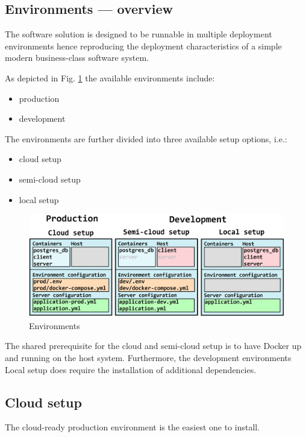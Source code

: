 \documentclass[a4paper,twoside,12pt]{book}
\begin{document}
\subsection{Environments — overview}

The software solution is designed to be runnable in multiple deployment environments hence reproducing the deployment characteristics of a simple modern business-class software system.

As depicted in Fig. \ref{fig:img:environments} the available environments include:
\begin{itemize}
\item production
\item development
\end{itemize}

The environments are further divided into three available setup options, i.e.:
\begin{itemize}
\item cloud setup
\item semi-cloud setup
\item local setup
\end{itemize}

\begin{figure}[H]
  \centering
  \includegraphics[width=\linewidth]{img/environments.png}
  \caption{Environments}
  \label{fig:img:environments}
\end{figure}

The shared prerequisite for the cloud and semi-cloud setup is to have Docker up and running on the host system. Furthermore, the development environments Local setup does require the installation of additional dependencies.

\subsection{Cloud setup}

The cloud-ready production environment is the easiest one to install.
\end{document}
